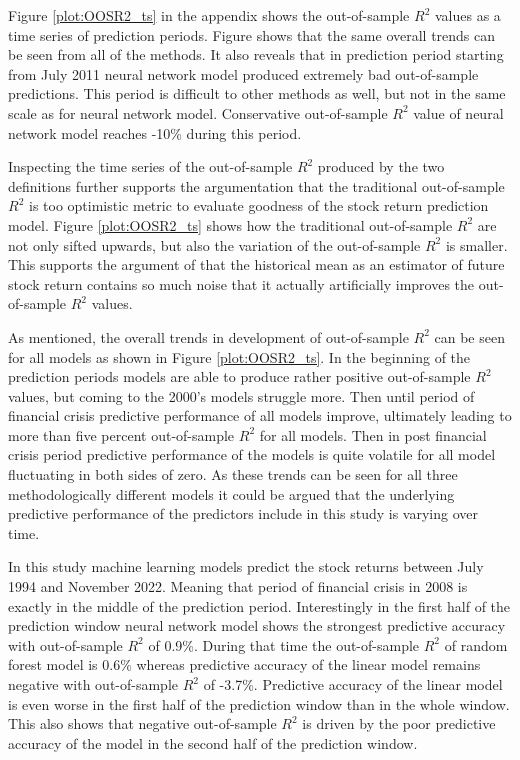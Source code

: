 \documentclass[12pt]{article}
\begin{document}

Figure \ref{plot:OOSR2_ts} in the appendix shows the out-of-sample $R^2$ values as a time series of prediction periods. Figure shows that the same overall trends can be seen from all of the methods. It also reveals that in prediction period starting from July 2011 neural network model produced extremely bad out-of-sample predictions. This period is difficult to other methods as well, but not in the same scale as for neural network model. Conservative out-of-sample $R^2$ value of neural network model reaches -10\% during this period. \par

Inspecting the time series of the out-of-sample $R^2$ produced by the two definitions further supports the argumentation that the traditional out-of-sample $R^2$ is too optimistic metric to evaluate goodness of the stock return prediction model. Figure \ref{plot:OOSR2_ts} shows how the traditional out-of-sample $R^2$ are not only sifted upwards, but also the variation of the out-of-sample $R^2$ is smaller. This supports the argument of \citet{guetal} that the historical mean as an estimator of future stock return contains so much noise that it actually artificially improves the out-of-sample $R^2$ values. \par

As mentioned, the overall trends in development of out-of-sample $R^2$ can be seen for all models as shown in Figure \ref{plot:OOSR2_ts}. In the beginning of the prediction periods models are able to produce rather positive out-of-sample $R^2$ values, but coming to the 2000's models struggle more. Then until period of financial crisis predictive performance of all models improve, ultimately leading to more than five percent out-of-sample $R^2$ for all models. Then in post financial crisis period predictive performance of the models is quite volatile for all model fluctuating in both sides of zero. As these trends can be seen for all three methodologically different models it could be argued that the underlying predictive performance of the predictors include in this study is varying over time. \par

In this study machine learning models predict the stock returns between July 1994 and November 2022. Meaning that period of financial crisis in 2008 is exactly in the middle of the prediction period. Interestingly in the first half of the prediction window neural network model shows the strongest predictive accuracy with out-of-sample $R^2$ of 0.9\%. During that time the out-of-sample $R^2$ of random forest model is 0.6\% whereas predictive accuracy of the linear model remains negative with out-of-sample $R^2$ of -3.7\%. Predictive accuracy of the linear model is even worse in the first half of the prediction window than in the whole window. This also shows that negative out-of-sample $R^2$ is driven by the poor predictive accuracy of the model in the second half of the prediction window. \par
\end{document}
